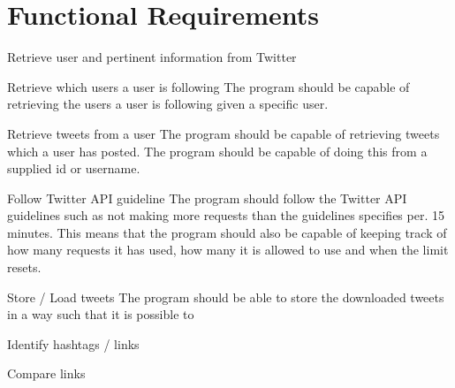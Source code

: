 \section{Functional Requirements}

\begin{requirement}{Retrieve user and pertinent information from Twitter}

\end{requirement}

\begin{requirement}{Retrieve which users a user is following}
The program should be capable of retrieving the users a user is
following given a specific user.
\end{requirement}

\begin{requirement}{Retrieve tweets from a user}
The program should be capable of retrieving tweets which a user has posted. The
program should be capable of doing this from a supplied id or username.
\end{requirement}

\begin{requirement}{Follow Twitter \ac{API} guideline}
The program should follow the Twitter \ac{API} guidelines such as not making
more requests than the guidelines specifies per. 15 minutes. This means that the
program should also be capable of keeping track of how many requests it has
used, how many it is allowed to use and when the limit resets.
\end{requirement}

\begin{requirement}{Store / Load tweets}
The program should be able to store the downloaded tweets in a way such that it
is possible to 
\end{requirement}

\begin{requirement}{Identify hashtags / links}

\end{requirement}

\begin{requirement}{Compare links}

\end{requirement}

